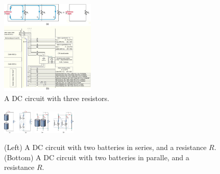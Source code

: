 \documentclass[12pt,twocolumn]{article}
\begin{document}
\begin{figure}
\centering
\includegraphics[width=0.4\textwidth,trim=0cm 13.5cm 5.5cm 0cm,clip=true]{parallel.jpeg}
\caption{\label{fig:para} A DC circuit with three resistors.}
\end{figure}
\begin{figure}
\centering
\includegraphics[width=0.13\textwidth,trim=0cm 0.5cm 4cm 0cm,clip=true]{series_batt.jpg}
\includegraphics[width=0.18\textwidth,trim=0cm 0.5cm 5.5cm 0.41cm,clip=true]{parallel_batt.jpg}
\caption{\label{fig:batt} (Left) A DC circuit with two batteries in series, and a resistance $R$. (Bottom) A DC circuit with two batteries in paralle, and a resistance $R$.}
\end{figure}
\end{document}
